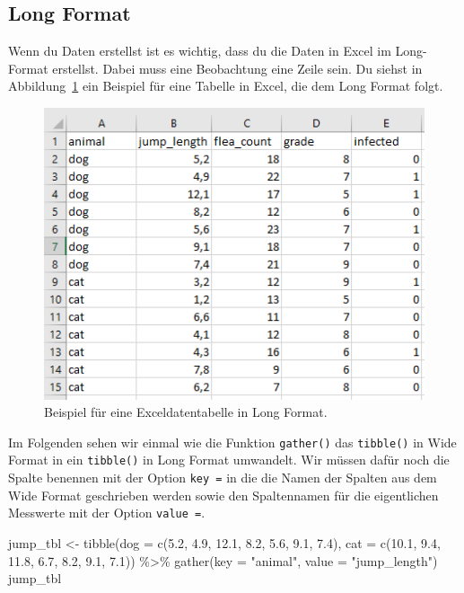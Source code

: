 \documentclass[
  letterpaper,
  DIV=11,
  oneside]{scrreport}
\newenvironment{Shaded}{\begin{snugshade}}{\end{snugshade}}
\newcommand{\AttributeTok}[1]{\textcolor[rgb]{0.40,0.45,0.13}{#1}}
\newcommand{\FloatTok}[1]{\textcolor[rgb]{0.68,0.00,0.00}{#1}}
\newcommand{\FunctionTok}[1]{\textcolor[rgb]{0.28,0.35,0.67}{#1}}
\newcommand{\NormalTok}[1]{\textcolor[rgb]{0.00,0.23,0.31}{#1}}
\newcommand{\OtherTok}[1]{\textcolor[rgb]{0.00,0.23,0.31}{#1}}
\newcommand{\SpecialCharTok}[1]{\textcolor[rgb]{0.37,0.37,0.37}{#1}}
\newcommand{\StringTok}[1]{\textcolor[rgb]{0.13,0.47,0.30}{#1}}
\begin{document}
\hypertarget{long-format}{%
\subsection{Long Format}\label{long-format}}

Wenn du Daten erstellst ist es wichtig, dass du die Daten in Excel im
Long-Format erstellst. Dabei muss eine Beobachtung eine Zeile sein. Du
siehst in Abbildung~\ref{fig-imp-long} ein Beispiel für eine Tabelle in
Excel, die dem Long Format folgt.

\begin{figure}

{\centering \includegraphics{./images/import_03.PNG}

}

\caption{\label{fig-imp-long}Beispiel für eine Exceldatentabelle in Long
Format.}

\end{figure}

Im Folgenden sehen wir einmal wie die Funktion \texttt{gather()} das
\texttt{tibble()} in Wide Format in ein \texttt{tibble()} in Long Format
umwandelt. Wir müssen dafür noch die Spalte benennen mit der Option
\texttt{key\ =} in die die Namen der Spalten aus dem Wide Format
geschrieben werden sowie den Spaltennamen für die eigentlichen Messwerte
mit der Option \texttt{value\ =}.

\begin{Shaded}
\begin{Highlighting}[]
\NormalTok{jump\_tbl }\OtherTok{\textless{}{-}} \FunctionTok{tibble}\NormalTok{(}\AttributeTok{dog =} \FunctionTok{c}\NormalTok{(}\FloatTok{5.2}\NormalTok{, }\FloatTok{4.9}\NormalTok{, }\FloatTok{12.1}\NormalTok{, }\FloatTok{8.2}\NormalTok{, }\FloatTok{5.6}\NormalTok{, }\FloatTok{9.1}\NormalTok{, }\FloatTok{7.4}\NormalTok{),}
                   \AttributeTok{cat =} \FunctionTok{c}\NormalTok{(}\FloatTok{10.1}\NormalTok{, }\FloatTok{9.4}\NormalTok{, }\FloatTok{11.8}\NormalTok{, }\FloatTok{6.7}\NormalTok{, }\FloatTok{8.2}\NormalTok{, }\FloatTok{9.1}\NormalTok{, }\FloatTok{7.1}\NormalTok{)) }\SpecialCharTok{\%\textgreater{}\%}
  \FunctionTok{gather}\NormalTok{(}\AttributeTok{key =} \StringTok{"animal"}\NormalTok{, }\AttributeTok{value =} \StringTok{"jump\_length"}\NormalTok{)}
\NormalTok{jump\_tbl}
\end{Highlighting}
\end{Shaded}
\end{document}
